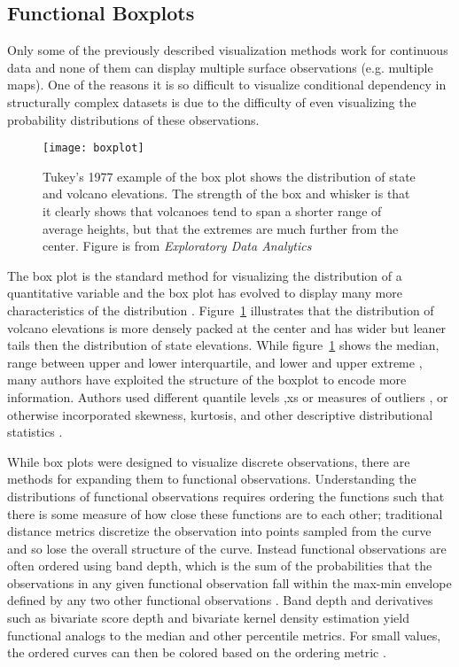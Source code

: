 \documentclass[../main.tex]{subfiles}
\begin{document}
\subsection{Functional Boxplots}
\label{sec:boxplots}

Only some of the previously described visualization methods work for continuous data and none of them can display multiple surface observations (e.g. multiple maps). One of the reasons it is so difficult to visualize conditional dependency in structurally complex datasets is due to the difficulty of even visualizing the probability distributions of these observations. 

\begin{figure}[H]
  \center
  \texttt{[image: boxplot]}
  \caption{Tukey's 1977 example of the box plot shows the distribution of state and volcano elevations. The strength of the box and whisker is that it clearly shows that volcanoes tend to span a shorter range of average heights, but that the extremes are much further from the center. Figure is from \textit{Exploratory Data Analytics} \cite{tukey_exploratory_1977} }
  \label{fig:boxplot}
\end{figure}

The box plot is the standard method for visualizing the distribution of a quantitative variable and the box plot has evolved to display many more characteristics of the distribution \cite{wickham_40_2011}. Figure~\ref{fig:boxplot} illustrates that the distribution of volcano elevations is more densely packed at the center and has wider but leaner tails then the distribution of state elevations. While figure~\ref{fig:boxplot} shows the median, range between upper and lower interquartile, and lower and upper extreme \cite{tukey_exploratory_1977}, many authors have exploited the structure of the boxplot to encode more information. Authors used different quantile levels \cite{hyndman_sample_1996},xs or measures of outliers \cite{frigge_implementations_1989, schwertman_identifying_2007}, or otherwise incorporated skewness, kurtosis, and other descriptive distributional statistics \cite{kim_more_2004, marmolejo-ramos_shifting_2015}.

While box plots were designed to visualize discrete observations, there are methods for expanding them to functional observations. Understanding the distributions of functional observations requires ordering the functions such that there is some measure of how close these functions are to each other; traditional distance metrics discretize the observation into points sampled from the curve and so lose the overall structure of the curve. Instead functional observations are often ordered using band depth, which is the sum of the probabilities that the observations in any given functional observation fall within the max-min envelope defined by any two other functional observations \cite{Febrero_functional_2007,lopez-pintado_functional_2007}. Band depth and derivatives such as bivariate score depth \cite{rob_j._hyndman_rainbow_2010} and bivariate kernel density estimation \cite{scott_multivariate_1992} yield functional analogs to the median and other percentile metrics. For small values, the ordered curves can then be colored based on the ordering metric \cite{rob_j._hyndman_rainbow_2010}. 
\end{document}
